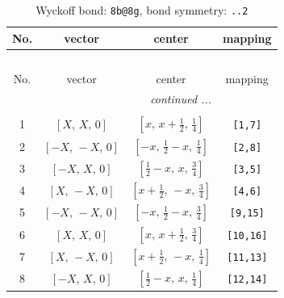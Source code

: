 \documentclass[fleqn,8pt]{jsarticle}
\begin{document}
\begin{longtable}{cccc}
\caption{Wyckoff bond: {\tt 8b@8g}, bond symmetry: {\tt ..2}}
 \\
 \hline \hline
No. & vector & center & mapping \\ \hline \endfirsthead

\multicolumn{3}{l}{\tablename\ \thetable{}} \\
 \hline \hline
No. & vector & center & mapping \\ \hline \endhead

 \hline \hline
\multicolumn{3}{r}{\footnotesize\it continued ...} \\ \endfoot

 \hline \hline
\multicolumn{3}{r}{} \\ \endlastfoot

1 & $\left[ X,\, X,\, 0 \right]$ & $\left[ x,\, x + \frac{1}{2},\, \frac{1}{4} \right]$ & {\tt [1,7]} \\ \hline
2 & $\left[ - X,\, - X,\, 0 \right]$ & $\left[ - x,\, \frac{1}{2} - x,\, \frac{1}{4} \right]$ & {\tt [2,8]} \\ \hline
3 & $\left[ - X,\, X,\, 0 \right]$ & $\left[ \frac{1}{2} - x,\, x,\, \frac{3}{4} \right]$ & {\tt [3,5]} \\ \hline
4 & $\left[ X,\, - X,\, 0 \right]$ & $\left[ x + \frac{1}{2},\, - x,\, \frac{3}{4} \right]$ & {\tt [4,6]} \\ \hline
5 & $\left[ - X,\, - X,\, 0 \right]$ & $\left[ - x,\, \frac{1}{2} - x,\, \frac{3}{4} \right]$ & {\tt [9,15]} \\ \hline
6 & $\left[ X,\, X,\, 0 \right]$ & $\left[ x,\, x + \frac{1}{2},\, \frac{3}{4} \right]$ & {\tt [10,16]} \\ \hline
7 & $\left[ X,\, - X,\, 0 \right]$ & $\left[ x + \frac{1}{2},\, - x,\, \frac{1}{4} \right]$ & {\tt [11,13]} \\ \hline
8 & $\left[ - X,\, X,\, 0 \right]$ & $\left[ \frac{1}{2} - x,\, x,\, \frac{1}{4} \right]$ & {\tt [12,14]} \\
\end{longtable}
\renewcommand{\arraystretch}{1.2}
\end{document}
